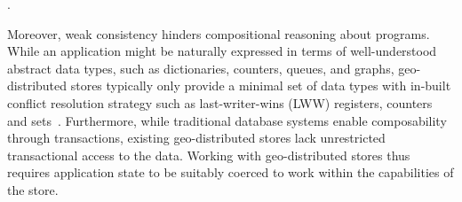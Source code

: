 .

Moreover, weak consistency hinders compositional reasoning about programs.
While an application might be naturally expressed in terms of well-understood
abstract data types, such as dictionaries, counters, queues, and graphs,
geo-distributed stores typically only provide a minimal set of data types with
in-built conflict resolution strategy such as last-writer-wins (LWW) registers,
counters and sets~\cite{Cassandra,DynamoDB}.  Furthermore, while traditional
database systems enable composability through transactions, existing
geo-distributed stores lack unrestricted transactional access to the data.
Working with geo-distributed stores thus requires application state to be
suitably coerced to work within the capabilities of the store.


